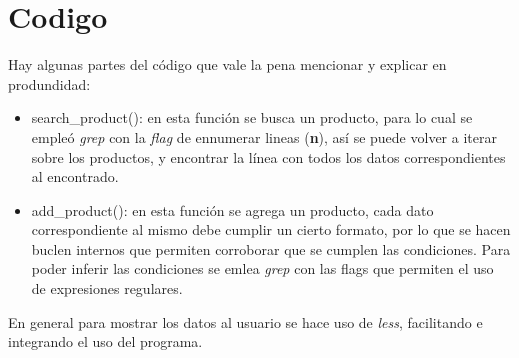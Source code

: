 \documentclass[letterpaper, 10 pt, conference]{ieeeconf}  %
\begin{document}
\section{Codigo}
Hay algunas partes del código que vale la pena mencionar y explicar en produndidad:
\begin{itemize}
  \item search\_product(): en esta función se busca un producto, para lo cual se empleó \textit{grep} con la \textit{flag} de ennumerar lineas (\textbf{n}), así se puede volver a iterar sobre los productos, y encontrar la línea con todos los datos correspondientes al encontrado.
  \item add\_product(): en esta función se agrega un producto, cada dato correspondiente al mismo debe cumplir un cierto formato, por lo que se hacen buclen internos que permiten corroborar que se cumplen las condiciones. Para poder inferir las condiciones se emlea \textit{grep} con las flags que permiten el uso de expresiones regulares.
\end{itemize}

En general para mostrar los datos al usuario se hace uso de \textit{less}, facilitando e integrando el uso del programa.
\end{document}
